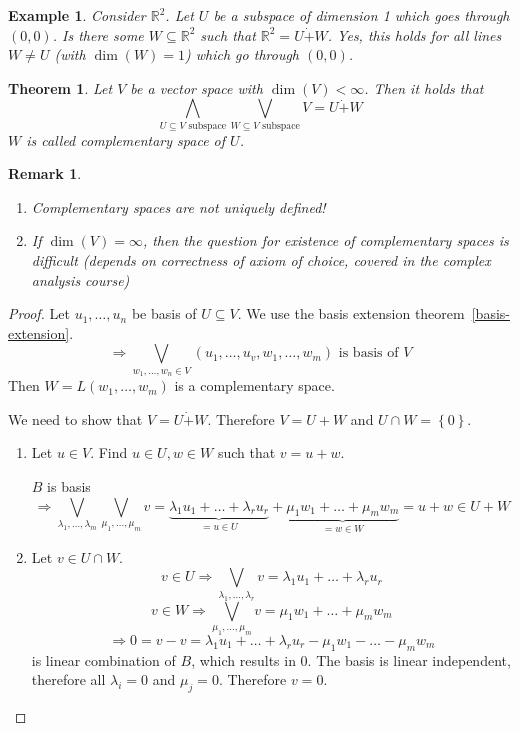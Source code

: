 \documentclass[a4paper,landscape,twocolumn]{article}
\newcommand\set[1]{\left\{#1\right\}}
\newtheorem{theorem}{Theorem}
\newtheorem{ex}{Example}
\newtheorem{rem}{Remark}
\begin{document}
\begin{ex}
  Consider $\mathbb R^2$. Let $U$ be a subspace of dimension 1 which goes through $(0, 0)$.
  Is there some $W \subseteq \mathbb R^2$ such that $\mathbb R^2 = U \dot{+} W$.
  Yes, this holds for all lines $W \neq U$ (with $\dim(W) = 1$) which go through $(0, 0)$.
\end{ex}

\begin{theorem}
  \label{satz-4-10}
  Let $V$ be a vector space with $\dim(V) < \infty$. Then it holds that
  \[ \bigwedge_{U \subseteq V \text{ subspace}} \bigvee_{W \subseteq V \text{ subspace}} V = U \dot{+} W \]
  $W$ is called \emph{complementary space of $U$}.
\end{theorem}

\begin{rem}
  \begin{enumerate}
    \item Complementary spaces are not uniquely defined!
    \item If $\dim(V) = \infty$, then the question for existence of complementary spaces is difficult
      (depends on correctness of axiom of choice, covered in the complex analysis course)
  \end{enumerate}
\end{rem}

\begin{proof}
  Let $u_1, \dots, u_n$ be basis of $U \subseteq V$.
  We use the basis extension theorem~\ref{basis-extension}.
  \[ \Rightarrow \bigvee_{w_1, \dots, w_n \in V} (u_1, \dots, u_v, w_1, \dots, w_m) \text{ is basis of } V \]
  Then $W = L(w_1, \dots, w_m)$ is a complementary space.

  We need to show that $V = U \dot{+} W$.
  Therefore $V = U + W$ and $U \cap W = \set{0}$.

  \begin{enumerate}
    \item
      Let $u \in V$. Find $u \in U, w \in W$ such that $v = u + w$.

      $B$ is basis
      \[
        \Rightarrow \bigvee_{\lambda_1, \dots, \lambda_m} \bigvee_{\mu_1, \dots, \mu_m} v
        = \underbrace{\lambda_1 u_1 + \dots + \lambda_r u_r}_{= u \in U} + \underbrace{\mu_1 w_1 + \dots + \mu_m w_m}_{= w \in W}
        = u + w \in U + W
      \]
    \item
      Let $v \in U \cap W$.
      \[ v \in U \Rightarrow \bigvee_{\lambda_1, \dots, \lambda_r} v = \lambda_1 u_1 + \dots + \lambda_r u_r \]
      \[ v \in W \Rightarrow \bigvee_{\mu_1, \dots, \mu_m} v = \mu_1 w_1 + \dots + \mu_m w_m \]
      \[ \Rightarrow 0 = v - v = \lambda_1 u_1 + \dots + \lambda_r u_r - \mu_1 w_1 - \dots - \mu_m w_m \]
      is linear combination of $B$, which results in $0$. The basis is linear independent,
      therefore all $\lambda_i = 0$ and $\mu_j = 0$. Therefore $v = 0$.
  \end{enumerate}
\end{proof}
\end{document}
